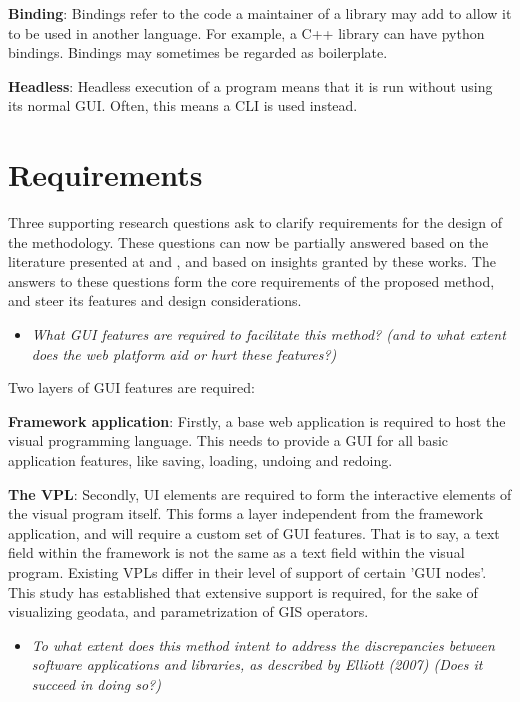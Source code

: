 \textbf{Binding}: Bindings refer to the code a maintainer of a library may add to allow it to be used in another language. For example, a C++ library can have python bindings. 
Bindings may sometimes be regarded as boilerplate.

\textbf{Headless}: Headless execution of a program means that it is run without using its normal \ac{GUI}. 
Often, this means a \ac{CLI} is used instead.

\section{Requirements}
\label{sec:method:require}

Three supporting research questions ask to clarify requirements for the design of the methodology. 
These questions can now be partially answered based on the literature presented at  and , and based on insights granted by these works.
The answers to these questions form the core requirements of the proposed method, and steer its features and design considerations.

\begin{itemize}[ ]
  \item \emph{What GUI features are required to facilitate this method? (and to what extent does the
  web platform aid or hurt these features?)}  
\end{itemize}

Two layers of \ac{GUI} features are required:

\textbf{Framework application}: Firstly, a base web application is required to host the visual programming language.
This needs to provide a \ac{GUI} for all basic application features, like saving, loading, undoing and redoing.

\textbf{The VPL}: Secondly, UI elements are required to form the interactive elements of the visual program itself. 
This forms a layer independent from the framework application, and will require a custom set of \ac{GUI} features. 
That is to say, a text field within the framework is not the same as a text field within the visual program.
Existing VPLs differ in their level of support of certain '\ac{GUI} nodes'.
This study has established that extensive support is required, for the sake of visualizing geodata, and parametrization of \ac{GIS} operators.

\begin{itemize}[ ]
  \item \emph{To what extent does this method intent to address the discrepancies between software
applications and libraries, as described by Elliott (2007) (Does it succeed in doing so?)}
\end{itemize}

